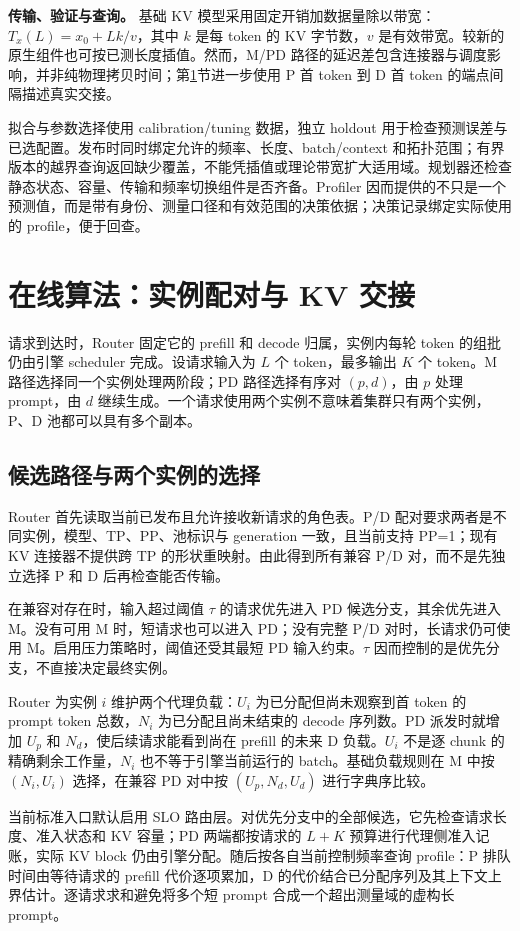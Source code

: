 \documentclass[11pt,a4paper,twocolumn]{article}
\newcommand{\para}[1]{\par\noindent\textbf{#1}\quad}
\begin{document}
\para{传输、验证与查询。}
基础 KV 模型采用固定开销加数据量除以带宽：$T_x(L)=x_0+Lk/v$，其中 $k$ 是每 token 的 KV 字节数，$v$ 是有效带宽。较新的原生组件也可按已测长度插值。然而，M/PD 路径的延迟差包含连接器与调度影响，并非纯物理拷贝时间；第\ref{sec:online}节进一步使用 P 首 token 到 D 首 token 的端点间隔描述真实交接。

拟合与参数选择使用 calibration/tuning 数据，独立 holdout 用于检查预测误差与已选配置。发布时同时绑定允许的频率、长度、batch/context 和拓扑范围；有界版本的越界查询返回缺少覆盖，不能凭插值或理论带宽扩大适用域。规划器还检查静态状态、容量、传输和频率切换组件是否齐备。Profiler 因而提供的不只是一个预测值，而是带有身份、测量口径和有效范围的决策依据；决策记录绑定实际使用的 profile，便于回查。

\section{在线算法：实例配对与 KV 交接}
\label{sec:online}
请求到达时，Router 固定它的 prefill 和 decode 归属，实例内每轮 token 的组批仍由引擎 scheduler 完成。设请求输入为 $L$ 个 token，最多输出 $K$ 个 token。M 路径选择同一个实例处理两阶段；PD 路径选择有序对 $(p,d)$，由 $p$ 处理 prompt，由 $d$ 继续生成。一个请求使用两个实例不意味着集群只有两个实例，P、D 池都可以具有多个副本。

\subsection{候选路径与两个实例的选择}
Router 首先读取当前已发布且允许接收新请求的角色表。P/D 配对要求两者是不同实例，模型、TP、PP、池标识与 generation 一致，且当前支持 PP=1；现有 KV 连接器不提供跨 TP 的形状重映射。由此得到所有兼容 P/D 对，而不是先独立选择 P 和 D 后再检查能否传输。

在兼容对存在时，输入超过阈值 $\tau$ 的请求优先进入 PD 候选分支，其余优先进入 M。没有可用 M 时，短请求也可以进入 PD；没有完整 P/D 对时，长请求仍可使用 M。启用压力策略时，阈值还受其最短 PD 输入约束。$\tau$ 因而控制的是优先分支，不直接决定最终实例。

Router 为实例 $i$ 维护两个代理负载：$U_i$ 为已分配但尚未观察到首 token 的 prompt token 总数，$N_i$ 为已分配且尚未结束的 decode 序列数。PD 派发时就增加 $U_p$ 和 $N_d$，使后续请求能看到尚在 prefill 的未来 D 负载。$U_i$ 不是逐 chunk 的精确剩余工作量，$N_i$ 也不等于引擎当前运行的 batch。基础负载规则在 M 中按 $(N_i,U_i)$ 选择，在兼容 PD 对中按 $(U_p,N_d,U_d)$ 进行字典序比较。

当前标准入口默认启用 SLO 路由层。对优先分支中的全部候选，它先检查请求长度、准入状态和 KV 容量；PD 两端都按请求的 $L+K$ 预算进行代理侧准入记账，实际 KV block 仍由引擎分配。随后按各自当前控制频率查询 profile：P 排队时间由等待请求的 prefill 代价逐项累加，D 的代价结合已分配序列及其上下文上界估计。逐请求求和避免将多个短 prompt 合成一个超出测量域的虚构长 prompt。
\end{document}
